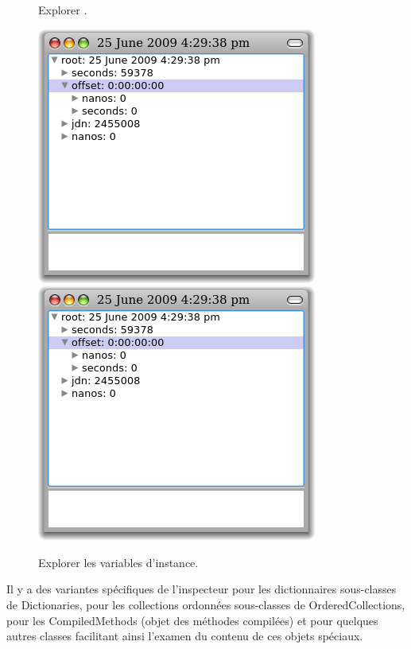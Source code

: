 \documentclass[a4paper,10pt,twoside]{book}
\begin{document}
\begin{figure}[tbp]
\begin{minipage}{0.48\textwidth}
	\caption{Explorer .}
	\label{fig:exploreTimeStampNow}
\end{minipage}
\hfill
\begin{minipage}{0.48\textwidth}
	\begin{center}
	\ifluluelse
		{\includegraphics[width=\textwidth]{exploreTimeStampNow2}}
		{\includegraphics[scale=0.7]{exploreTimeStampNow2}}
	\end{center}
	\caption{Explorer les variables d'instance.}
	\label{fig:exploreTimeStampNow2}
\end{minipage}
\end{figure}

Il y a des variantes sp\'ecifiques de l'inspecteur pour les dictionnaires sous-classes de Dictionaries, pour les collections ordonn\'ees sous-classes de OrderedCollections, pour les CompiledMethods (objet des m\'ethodes compil\'ees)
et pour quelques autres classes facilitant ainsi l'examen du contenu de
ces objets sp\'eciaux.
\end{document}

